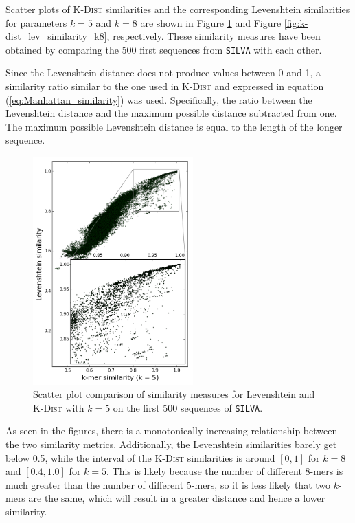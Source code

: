 Scatter plots of \textsc{K-Dist} similarities and the corresponding Levenshtein
similarities for parameters $k=5$ and $k=8$ are shown in Figure
\ref{fig:k-dist_lev_similarity_k5} and Figure
\ref{fig:k-dist_lev_similarity_k8}, respectively. These similarity measures
have been obtained by comparing the 500 first sequences from \texttt{SILVA}
with each other.

Since the Levenshtein distance does not produce values between 0 and 1, a
similarity ratio similar to the one used in \textsc{K-Dist} and expressed in
equation (\ref{eq:Manhattan_similarity}) was used. Specifically, the ratio
between the Levenshtein distance and the maximum possible distance subtracted
from one. The maximum possible Levenshtein distance is equal to the length of
the longer sequence.

\begin{figure}
  \includegraphics[width=0.55\textwidth]{graphics/Levenshtein_K-Dist_k5.png}
  \caption{Scatter plot comparison of similarity measures for Levenshtein and
    \textsc{K-Dist} with $k=5$ on the first 500 sequences of \texttt{SILVA}.}
  \label{fig:k-dist_lev_similarity_k5}
\end{figure}

As seen in the figures, there is a monotonically increasing relationship
between the two similarity metrics. Additionally, the Levenshtein similarities
barely get below 0.5, while the interval of the \textsc{K-Dist} similarities is
around $[0,1]$ for $k=8$ and $[0.4,1.0]$ for $k=5$. This is likely because the
number of different 8-mers is much greater than the number of different 5-mers,
so it is less likely that two $k$-mers are the same, which will result in a
greater distance and hence a lower similarity.

